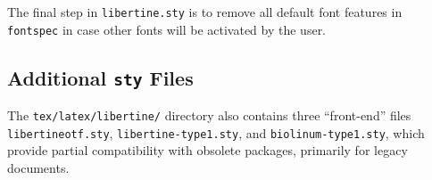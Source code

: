 \documentclass[11pt]{article}
\begin{document}
The final step in \verb|libertine.sty| is to remove all default font features
in \texttt{fontspec} in case other fonts will be activated by the user.

\subsection{Additional \texttt{sty} Files}
The \verb|tex/latex/libertine/| directory also contains three ``front-end'' files
\verb|libertineotf.sty|, \verb|libertine-type1.sty|, and \verb|biolinum-type1.sty|,
which provide partial compatibility with obsolete packages, primarily for legacy
documents.
\end{document}
